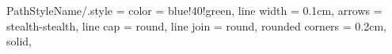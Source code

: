 
\tikzset
{
	PathStyleName/.style =
	{
		color				= blue!40!green,	%
		line width			= 0.1cm,			%
		arrows				= stealth-stealth,	%
		line cap			= round,			%
		line join			= round,			%
		rounded corners		= 0.2cm,			%
		solid,
	}
}	%
